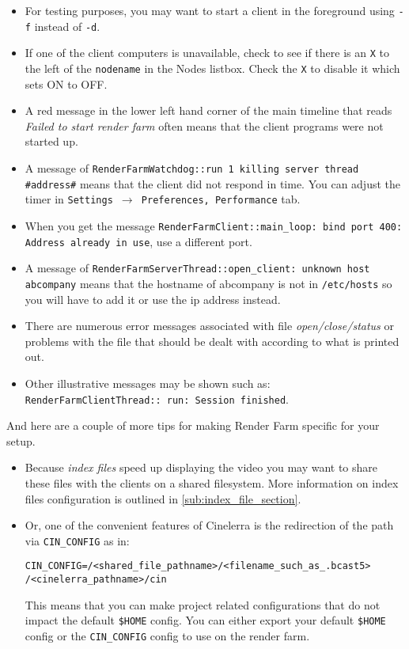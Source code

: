 \begin{itemize}
    \item For testing purposes, you may want to start a client in the foreground using \texttt{-f} instead of \texttt{-d}.
    \item If one of the client computers is unavailable, check to see if there is an \texttt{X} to the left of the \texttt{nodename}
    in the Nodes listbox.  Check the \texttt{X} to disable it which sets ON to OFF.
    \item A red message in the lower left hand corner of the main timeline that reads \textit{Failed to start render
    farm} often means that the client \CGG{} programs were not started up.
    \item A message of \texttt{RenderFarmWatchdog::run 1 killing server thread \\ \#address\#} means that the client did
    not respond in time.  You can adjust the timer in \texttt{Settings $\rightarrow$ Preferences, Performance} tab.
    \item When you get the message \texttt{RenderFarmClient::main\_loop: bind port 400: Address already in use}, use a different port.
    \item A message of \texttt{RenderFarmServerThread::open\_client: unknown host abcompany} means that the
    hostname of abcompany is not in \texttt{/etc/hosts} so you will have to add it or use the ip address instead.
    \item There are numerous error messages associated with file \textit{open/close/status} or problems with the file
    that should be dealt with according to what is printed out.
    \item Other illustrative messages may be shown such as: \texttt{RenderFarmClientThread:: run: Session finished}.
\end{itemize}

And here are a couple of more tips for making Render Farm specific for your setup.
\begin{itemize}
    \item Because \textit{index files} speed up displaying the video you may want to share these files
with the clients on a shared filesystem. More information on index files configuration is outlined in
\ref{sub:index_file_section}.
    \item Or, one of the convenient features of Cinelerra is the redirection of the path
 via \texttt{CIN\_CONFIG} as in:
\begin{lstlisting}[style=sh]
CIN_CONFIG=/<shared_file_pathname>/<filename_such_as_.bcast5> /<cinelerra_pathname>/cin
\end{lstlisting}
This means that you can make project related configurations that do not impact the default \texttt{\$HOME} config.  You can either export your default \texttt{\$HOME} config or the \texttt{CIN\_CONFIG} config to use on the render farm.
\end{itemize}

